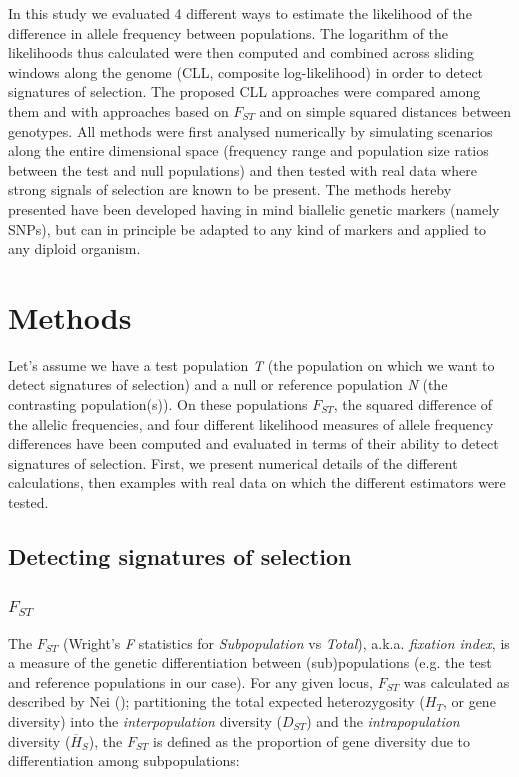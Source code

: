 \documentclass{bmcart}
\begin{document}
In this study we evaluated 4 different ways to estimate the likelihood
of the difference in allele frequency between populations. The logarithm
of the likelihoods thus calculated were then computed and combined across sliding windows
along the genome (CLL, composite log-likelihood) in order to detect
signatures of selection. The proposed CLL approaches were compared among
them and with approaches based on $F_{ST}$ and on simple squared
distances between genotypes. All methods were first analysed numerically
 by simulating scenarios along the entire dimensional space (frequency range
 and population size ratios between the test and null populations) and then tested with real data where strong signals
of selection are known to be present. The methods hereby presented have
been developed having in mind biallelic genetic markers (namely SNPs),
but can in principle be adapted to any kind of markers and applied to
any diploid organism.

\section*{Methods}

Let's assume we have a test population \emph{T} (the population on which we want to detect
signatures of selection) and a null or reference population \emph{N} (the
contrasting population(s)). On these populations $F_{ST}$, the squared
difference of the allelic frequencies, and four different likelihood
measures of allele frequency differences have been computed and
evaluated in terms of their ability to detect signatures of selection. 
First, we present numerical details of the different calculations, then
examples with real data on which the different estimators were tested.


\subsection*{Detecting signatures of selection}
\subsubsection*{$F_{ST}$}
The $F_{ST}$ (Wright's \emph{F} statistics for \emph{Subpopulation} vs
\emph{Total}), a.k.a. \emph{fixation index}, is a measure of the genetic
differentiation between (sub)populations (e.g. the test and reference
populations in our case). For any given locus, $F_{ST}$ was calculated as
described by Nei (\cite{nei1977f}); partitioning the total
expected heterozygosity ($H_T$, or gene diversity) into the
\emph{interpopulation} diversity ($D_{ST}$) and the
\emph{intrapopulation} diversity ($\overline{H}_S$),
the $F_{ST}$ is defined as the proportion of gene diversity due to
differentiation among subpopulations:
\end{document}
